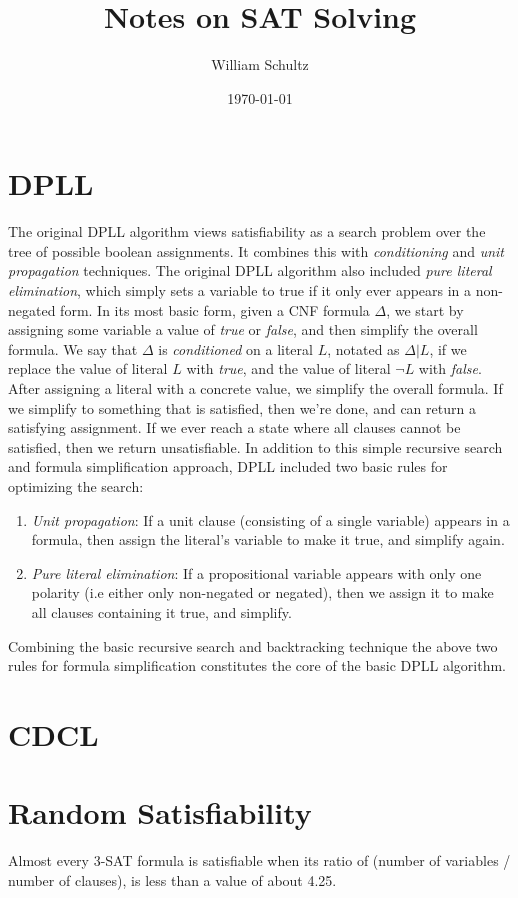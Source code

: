 \documentclass[12pt]{article}
\begin{document}
\title{Notes on SAT Solving}
\author{William Schultz}
\date{\today}

\maketitle

\section{DPLL}

The original DPLL algorithm views satisfiability as a search problem over the tree of possible boolean assignments. It combines this with \textit{conditioning} and \textit{unit propagation} techniques. The original DPLL algorithm also included \textit{pure literal elimination}, which simply sets a variable to true if it only ever appears in a non-negated form. In its most basic form, given a CNF formula $\Delta$, we start by assigning some variable a value of \textit{true} or \textit{false}, and then simplify the overall formula. We say that $\Delta$ is \textit{conditioned} on a literal $L$, notated as $\Delta|L$, if we replace the value of literal $L$ with \textit{true}, and the value of literal $\neg L$ with \textit{false}. After assigning a literal with a concrete value, we simplify the overall formula. If we simplify to something that is satisfied, then we're done, and can return a satisfying assignment. If we ever reach a state where all clauses cannot be satisfied, then we return unsatisfiable. In addition to this simple recursive search and formula simplification approach, DPLL included two basic rules for optimizing the search:
\begin{enumerate}
    \item \textit{Unit propagation}: If a unit clause (consisting of a single variable) appears in a formula, then assign the literal's variable to make it true, and simplify again.
    \item \textit{Pure literal elimination}: If a propositional variable appears with only one polarity (i.e either only non-negated or negated), then we assign it to make all clauses containing it true, and simplify.
\end{enumerate}
Combining the basic recursive search and backtracking technique the above two rules for formula simplification constitutes the core of the basic DPLL algorithm.

\section{CDCL}

\section{Random Satisfiability}

Almost every 3-SAT formula is satisfiable when its ratio of (number of variables / number of clauses), is less than a value of about 4.25.
\end{document}
